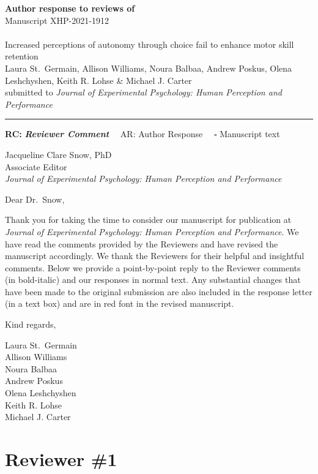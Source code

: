 \documentclass[final]{article}
\begin{document}
{\Large\bf Author response to reviews of}\\[1em]
Manuscript XHP-2021-1912\\ \\
{\Large Increased perceptions of autonomy through choice fail to enhance motor skill retention}\\[1em]
{Laura St.~Germain, Allison Williams, Noura Balbaa, Andrew Poskus, Olena Leshchyshen, Keith R. Lohse \& Michael J. Carter}\\
{submitted to \it Journal of Experimental Psychology: Human Perception and Performance }\\
\hrule

\hfill {\bfseries RC:} \textbf{\textit{Reviewer Comment}}\(\quad\) AR: Author Response \(\quad\square\) Manuscript text

\vspace{2em}

Jacqueline Clare Snow, PhD\\
Associate Editor\\
\emph{Journal of Experimental Psychology: Human Perception and Performance}

Dear Dr.~Snow,

Thank you for taking the time to consider our manuscript for publication at \emph{Journal of Experimental Psychology: Human Perception and Performance}. We have read the comments provided by the Reviewers and have revised the manuscript accordingly. We thank the Reviewers for their helpful and insightful comments. Below we provide a point-by-point reply to the Reviewer comments (in bold-italic) and our responses in normal text. Any substantial changes that have been made to the original submission are also included in the response letter (in a text box) and are in red font in the revised manuscript.

Kind regards,

Laura St.~Germain\\
Allison Williams\\
Noura Balbaa\\
Andrew Poskus\\
Olena Leshchyshen\\
Keith R. Lohse\\
Michael J. Carter

\hypertarget{reviewer-1}{%
\section{Reviewer \#1}\label{reviewer-1}}
\end{document}
